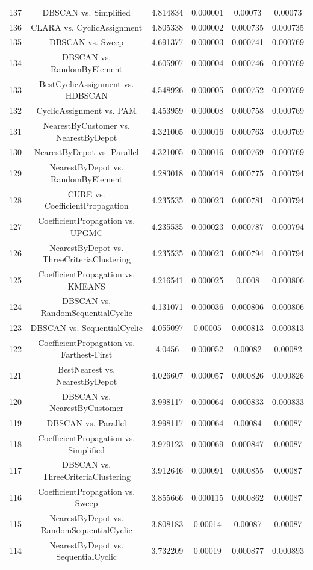 \documentclass[a4paper,10pt]{article}
\begin{document}
\begin{landscape}
\begin{table}[!htp]
\begin{tabular}{cccccc}
137&DBSCAN vs. Simplified&4.814834&0.000001&0.00073&0.00073\\
136&CLARA vs. CyclicAssignment&4.805338&0.000002&0.000735&0.000735\\
135&DBSCAN vs. Sweep&4.691377&0.000003&0.000741&0.000769\\
134&DBSCAN vs. RandomByElement&4.605907&0.000004&0.000746&0.000769\\
133&BestCyclicAssignment vs. HDBSCAN&4.548926&0.000005&0.000752&0.000769\\
132&CyclicAssignment vs. PAM&4.453959&0.000008&0.000758&0.000769\\
131&NearestByCustomer vs. NearestByDepot&4.321005&0.000016&0.000763&0.000769\\
130&NearestByDepot vs. Parallel&4.321005&0.000016&0.000769&0.000769\\
129&NearestByDepot vs. RandomByElement&4.283018&0.000018&0.000775&0.000794\\
128&CURE vs. CoefficientPropagation&4.235535&0.000023&0.000781&0.000794\\
127&CoefficientPropagation vs. UPGMC&4.235535&0.000023&0.000787&0.000794\\
126&NearestByDepot vs. ThreeCriteriaClustering&4.235535&0.000023&0.000794&0.000794\\
125&CoefficientPropagation vs. KMEANS&4.216541&0.000025&0.0008&0.000806\\
124&DBSCAN vs. RandomSequentialCyclic&4.131071&0.000036&0.000806&0.000806\\
123&DBSCAN vs. SequentialCyclic&4.055097&0.00005&0.000813&0.000813\\
122&CoefficientPropagation vs. Farthest-First&4.0456&0.000052&0.00082&0.00082\\
121&BestNearest vs. NearestByDepot&4.026607&0.000057&0.000826&0.000826\\
120&DBSCAN vs. NearestByCustomer&3.998117&0.000064&0.000833&0.000833\\
119&DBSCAN vs. Parallel&3.998117&0.000064&0.00084&0.00087\\
118&CoefficientPropagation vs. Simplified&3.979123&0.000069&0.000847&0.00087\\
117&DBSCAN vs. ThreeCriteriaClustering&3.912646&0.000091&0.000855&0.00087\\
116&CoefficientPropagation vs. Sweep&3.855666&0.000115&0.000862&0.00087\\
115&NearestByDepot vs. RandomSequentialCyclic&3.808183&0.00014&0.00087&0.00087\\
114&NearestByDepot vs. SequentialCyclic&3.732209&0.00019&0.000877&0.000893\\

\end{tabular}
\end{table}
\end{landscape}
\end{document}
